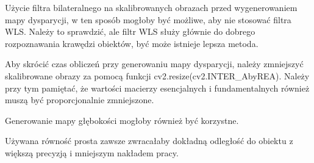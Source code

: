 \documentclass[magisterska]{pracadypl}
\begin{document}
Użycie filtra bilateralnego na skalibrowanych obrazach przed wygenerowaniem mapy dysparycji, w ten sposób mogłoby być możliwe, aby nie stosować filtra WLS. Należy to sprawdzić, ale filtr WLS służy głównie do dobrego rozpoznawania krawędzi obiektów, być może istnieje lepsza metoda.

Aby skrócić czas obliczeń przy generowaniu mapy dysparycji, należy zmniejszyć skalibrowane obrazy za pomocą funkcji cv2.resize(cv2.INTER\_AbyREA). Należy przy tym pamiętać, że wartości macierzy esencjalnych i fundamentalnych również muszą być proporcjonalnie zmniejszone.

Generowanie mapy głębokości mogłoby również być korzystne.

Używana równość prosta zawsze zwracałaby dokładną odległość do obiektu z większą precyzją i mniejszym nakładem pracy.

\renewcommand{\listfigurename}{Spis rysunków}
\listoffigures
\end{document}
